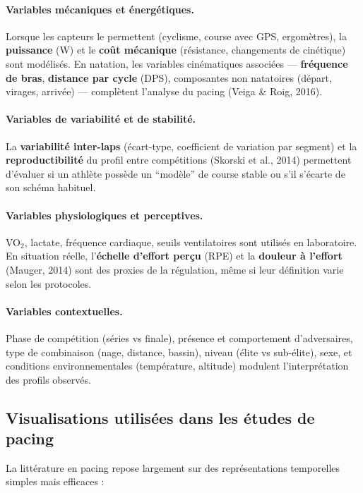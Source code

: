 \documentclass[11pt,a4paper]{article}
\begin{document}
\paragraph{Variables mécaniques et énergétiques.}
Lorsque les capteurs le permettent (cyclisme, course avec GPS, ergomètres), la \textbf{puissance} (W) et le \textbf{coût mécanique} (résistance, changements de cinétique) sont modélisés. En natation, les variables cinématiques associées --- \textbf{fréquence de bras}, \textbf{distance par cycle} (DPS), composantes non natatoires (départ, virages, arrivée) --- complètent l'analyse du pacing (Veiga \& Roig, 2016).

\paragraph{Variables de variabilité et de stabilité.}
La \textbf{variabilité inter-laps} (écart-type, coefficient de variation par segment) et la \textbf{reproductibilité} du profil entre compétitions (Skorski et al., 2014) permettent d'évaluer si un athlète possède un ``modèle'' de course stable ou s'il s'écarte de son schéma habituel.

\paragraph{Variables physiologiques et perceptives.}
VO$_2$, lactate, fréquence cardiaque, seuils ventilatoires sont utilisés en laboratoire. En situation réelle, l'\textbf{échelle d'effort perçu} (RPE) et la \textbf{douleur à l'effort} (Mauger, 2014) sont des proxies de la régulation, même si leur définition varie selon les protocoles.

\paragraph{Variables contextuelles.}
Phase de compétition (séries vs finale), présence et comportement d'adversaires, type de combinaison (nage, distance, bassin), niveau (élite vs sub-élite), sexe, et conditions environnementales (température, altitude) modulent l'interprétation des profils observés.

\subsection{Visualisations utilisées dans les études de pacing}

La littérature en pacing repose largement sur des représentations temporelles simples mais efficaces :
\end{document}
